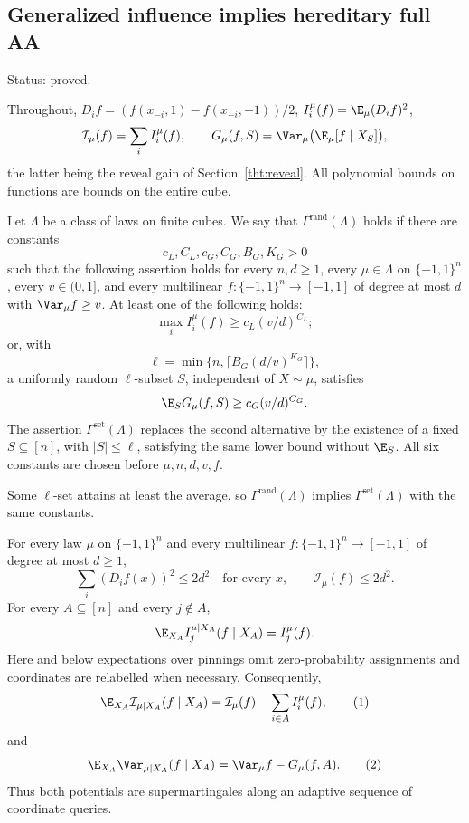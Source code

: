 \subsection{Generalized influence implies hereditary full AA}
\label{ian:generalized-influence-bridge}

Status: proved.

Throughout, \(D_i f=(f(x_{-i},1)-f(x_{-i},-1))/2\),
\(I_i^\mu(f)=\E_\mu(D_i f)^2\),
\[
 \mathcal I_\mu(f)=\sum_i I_i^\mu(f),
 \qquad
 G_\mu(f,S)=\Var_\mu\bigl(\E_\mu[f\mid X_S]\bigr),
\]
the latter being the reveal gain of Section~\ref{tht:reveal}.
All polynomial bounds on functions are bounds on the entire cube.

\begin{definition}[Generalized AA]
\label{ian:gamma-definition}
Let \(\Lambda\) be a class of laws on finite cubes. We say that
\(\Gamma^{\mathrm{rand}}(\Lambda)\) holds if there are constants
\[
 c_L,C_L,c_G,C_G,B_G,K_G>0
\]
such that the following assertion holds for every \(n,d\ge1\), every
\(\mu\in\Lambda\) on \(\{-1,1\}^n\), every \(v\in(0,1]\), and every
multilinear \(f:\{-1,1\}^n\to[-1,1]\) of degree at most \(d\) with
\(\Var_\mu f\ge v\). At least one of the following holds:
\[
 \max_i I_i^\mu(f)\ge c_L(v/d)^{C_L};
\]
or, with
\[
 \ell=\min\{n,\lceil B_G(d/v)^{K_G}\rceil\},
\]
a uniformly random \(\ell\)-subset \(S\), independent of \(X\sim\mu\),
satisfies
\[
 \E_S G_\mu(f,S)\ge c_G(v/d)^{C_G}.
\]
The assertion \(\Gamma^{\mathrm{set}}(\Lambda)\) replaces the second
alternative by the existence of a fixed \(S\subseteq[n]\), with
\(|S|\le\ell\), satisfying the same lower bound without \(\E_S\).
All six constants are chosen before \(\mu,n,d,v,f\).
\end{definition}

Some \(\ell\)-set attains at least the average, so
\(\Gamma^{\mathrm{rand}}(\Lambda)\) implies
\(\Gamma^{\mathrm{set}}(\Lambda)\) with the same constants.

\begin{lemma}
\label{ian:query-potentials}
For every law \(\mu\) on \(\{-1,1\}^n\) and every multilinear
\(f:\{-1,1\}^n\to[-1,1]\) of degree at most \(d\ge1\),
\[
 \sum_i(D_i f(x))^2\le2d^2
 \quad\text{for every }x,
 \qquad
 \mathcal I_\mu(f)\le2d^2.
\]
For every \(A\subseteq[n]\) and every \(j\notin A\),
\[
 \E_{X_A} I_j^{\mu\mid X_A}(f\mid X_A)=I_j^\mu(f).
\]
Here and below expectations over pinnings omit zero-probability
assignments and coordinates are relabelled when necessary. Consequently,
\[
 \E_{X_A}\mathcal I_{\mu\mid X_A}(f\mid X_A)
 =\mathcal I_\mu(f)-\sum_{i\in A}I_i^\mu(f),
 \tag{1}\label{ian:influence-decrement}
\]
and
\[
 \E_{X_A}\Var_{\mu\mid X_A}(f\mid X_A)
 =\Var_\mu f-G_\mu(f,A).
 \tag{2}\label{ian:variance-decrement}
\]
Thus both potentials are supermartingales along an adaptive sequence
of coordinate queries.
\end{lemma}

